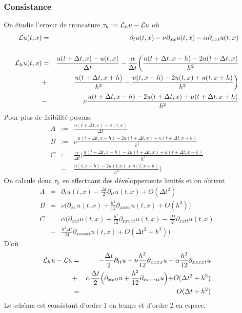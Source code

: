 \subsubsection{Consistance}
On étudie l'erreur de troncature $\tau_h := \mathcal{L}_hu - \mathcal{L} u$ où
\begin{eqnarray*}
    \mathcal{L} u(t,x) &=& \partial_tu(t,x) - \nu \partial_{xx}u(t,x)-\alpha\partial_{xxt}u(t,x) \\
    && \\
     \mathcal{L}_hu(t,x) &=& \frac{u(t+\Delta t,x)-u(t,x)}{\Delta t}-\frac{\alpha}{\Delta t}\bigg(\frac{u(t+\Delta t,x-h)-2u(t+\Delta t, x)}{h^2} \\
     &+& \frac{u(t+\Delta t, x+h)}{h^2}-\frac{u(t,x-h)-2u(t, x)+u(t, x+h)}{h^2}\bigg)\\ 
     &-& \nu \frac{u(t+\Delta t,x-h)-2u(t+\Delta t, x)+u(t+\Delta t, x+h)}{h^2}  
\end{eqnarray*}
Pour plus de lisibilité posons,
\begin{eqnarray*}
    A &:=& \frac{u(t+\Delta t,x)-u(t,x)}{\Delta t} \\
    B &:=&  \nu \frac{u(t+\Delta t,x-h)-2u(t+\Delta t, x)+u(t+\Delta t, x+h)}{h^2} \\
    C &:=& \frac{\alpha}{\Delta t}\bigg(\frac{u(t+\Delta t,x-h)-2u(t+\Delta t, x) + u(t+\Delta t, x+h)}{h^2} \\
    &-&\frac{u(t,x-h)-2u(t, x)+u(t, x+h)}{h^2}\bigg)
\end{eqnarray*}
On calcule donc $\tau_h$ en effectuant des développements limités et on obtient
\begin{eqnarray*}
    A &=& \partial_{t}u(t,x) - \frac{\Delta t}{2} \partial_{tt}u(t,x) + O(\Delta t^2) \\
    B &=&  \nu \Big(\partial_{xx}u(t,x) + \frac{h^2}{12} \partial_{xxxx}u(t,x) + O(h^3)\Big) \\
    C &=& \alpha\Big(\partial_{xxt}u(t,x) + \frac{h^2}{12}\partial_{xxxxt}u(t,x) - \frac{\Delta t}{2}\partial_{xxtt}u(t,x) \\
    &-& \frac{h^2\Delta t}{24}\partial_{xxxxtt}u(t,x) + O(\Delta t^2 + h^3)\Big)   
\end{eqnarray*}
D'où 
\begin{eqnarray*}
    \mathcal{L}_hu -\mathcal{L} u &=& -\frac{\Delta t}{2}\partial_{tt}u - \nu \frac{h^2}{12}\partial_{xxxx}u - \alpha\frac{h^2}{12}\partial_{xxxxt}u \\
    &+& \alpha\frac{\Delta t }{2}\Bigl(\partial_{xxtt}u + \frac{h^2}{12}\partial_{xxxxtt}u \Bigl) + O(\Delta t^2 + h^3) \\
    &=& O(\Delta t + h^2)
\end{eqnarray*}
Le schéma est consistant d'ordre 1 en temps et d'ordre 2 en espace.

